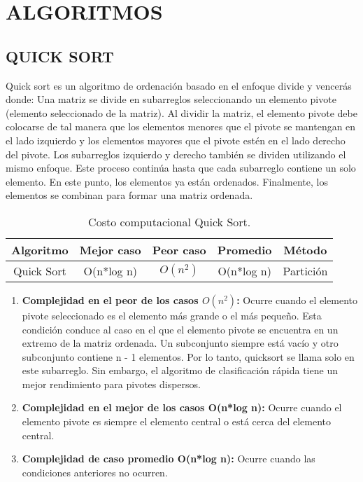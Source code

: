 \documentclass{article}
\begin{document}

\section{ALGORITMOS}
\subsection{QUICK SORT}
Quick sort es un algoritmo de ordenación basado en el enfoque divide y vencerás donde: Una matriz se divide en subarreglos seleccionando un elemento pivote (elemento seleccionado de la matriz). Al dividir la matriz, el elemento pivote debe colocarse de tal manera que los elementos menores que el pivote se mantengan en el lado izquierdo y los elementos mayores que el pivote estén en el lado derecho del pivote. Los subarreglos izquierdo y derecho también se dividen utilizando el mismo enfoque. Este proceso continúa hasta que cada subarreglo contiene un solo elemento. En este punto, los elementos ya están ordenados. Finalmente, los elementos se combinan para formar una matriz ordenada.

    \begin{table}[h!]
        \centering
        \begin{tabular}{||c c c c c||} 
         \hline
         \textbf{Algoritmo} & \textbf{Mejor caso} & \textbf{Peor caso} & \textbf{Promedio} & \textbf{Método} \\ [0.5ex] 
         \hline\hline
         Quick Sort & O(n*log n) & \(O(n^2)\) & O(n*log n) & Partición \\ [0.5ex] 
         \hline
        \end{tabular}
        \caption{Costo computacional Quick Sort.}
        \label{table:dataQuickSort}
    \end{table}

    \begin{enumerate}
        \item \textbf{Complejidad en el peor de los casos \(O(n^2)\):} Ocurre cuando el elemento pivote seleccionado es el elemento más grande o el más pequeño. Esta condición conduce al caso en el que el elemento pivote se encuentra en un extremo de la matriz ordenada. Un subconjunto siempre está vacío y otro subconjunto contiene n - 1 elementos. Por lo tanto, quicksort se llama solo en este subarreglo. Sin embargo, el algoritmo de clasificación rápida tiene un mejor rendimiento para pivotes dispersos.
        
        \item \textbf{Complejidad en el mejor de los casos O(n*log n):} Ocurre cuando el elemento pivote es siempre el elemento central o está cerca del elemento central.
        
        \item \textbf{Complejidad de caso promedio O(n*log n):} Ocurre cuando las condiciones anteriores no ocurren.
    \end{enumerate}
        
\end{document}

